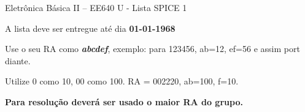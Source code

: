 \documentclass[addpoints]{exam}
\begin{document}
 
\begin{center}
Eletrônica Básica II – EE640 U - Lista SPICE 1
\end{center}
 
\vspace{5mm}
 
\noindent{}
\hfill
{}

\vspace{2mm}

\noindent{}
\hfill
{}

\vspace{2mm}

\noindent{}
\hfill
{}

\vspace{2mm}

\noindent{}
\hfill
{}

\begin{center}
A lista deve ser entregue até dia \textbf{01-01-1968}

\vspace{5mm}

Use o seu RA como \textit{\textbf{abcdef}}, exemplo: para 123456, ab=12, ef=56 e assim port diante.

Utilize 0 como 10, 00 como 100. RA = 002220, ab=100, f=10.

\vspace{2mm}

\textbf{Para resolução deverá ser usado o maior RA do grupo.}

\end{center}

\begin{center}
\gradetable[h][questions]
\end{center}

\hspace{2mm}
\end{document}
